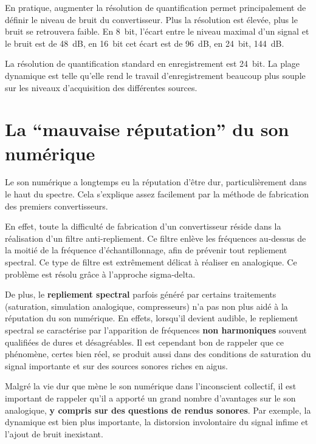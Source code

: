 \documentclass[
]{book}
\begin{document}
En pratique, augmenter la résolution de quantification permet principalement de définir le niveau de bruit du convertisseur. Plus la résolution est élevée, plus le bruit se retrouvera faible. En 8~bit, l'écart entre le niveau maximal d'un signal et le bruit est de 48~dB, en 16~bit cet écart est de 96~dB, en 24~bit, 144~dB.

La résolution de quantification standard en enregistrement est 24~bit. La plage dynamique est telle qu'elle rend le travail d'enregistrement beaucoup plus souple sur les niveaux d'acquisition des différentes sources.

\hypertarget{la-mauvaise-ruxe9putation-du-son-numuxe9rique}{%
\section{La ``mauvaise réputation'' du son numérique}\label{la-mauvaise-ruxe9putation-du-son-numuxe9rique}}

Le son numérique a longtemps eu la réputation d'être dur, particulièrement dans le haut du spectre. Cela s'explique assez facilement par la méthode de fabrication des premiers convertisseurs.

En effet, toute la difficulté de fabrication d'un convertisseur réside dans la réalisation d'un filtre anti-repliement. Ce filtre enlève les fréquences au-dessus de la moitié de la fréquence d'échantillonnage, afin de prévenir tout repliement spectral. Ce type de filtre est extrêmement délicat à réaliser en analogique. Ce problème est résolu grâce à l'approche sigma-delta.

De plus, le \textbf{repliement spectral} parfois généré par certains traitements (saturation, simulation analogique, compresseurs) n'a pas non plus aidé à la réputation du son numérique. En effets, lorsqu'il devient audible, le repliement spectral se caractérise par l'apparition de fréquences \textbf{non harmoniques} souvent qualifiées de dures et désagréables. Il est cependant bon de rappeler que ce phénomène, certes bien réel, se produit aussi dans des conditions de saturation du signal importante et sur des sources sonores riches en aigus.

Malgré la vie dur que mène le son numérique dans l'inconscient collectif, il est important de rappeler qu'il a apporté un grand nombre d'avantages sur le son analogique, \textbf{y compris sur des questions de rendus sonores}. Par exemple, la dynamique est bien plus importante, la distorsion involontaire du signal infime et l'ajout de bruit inexistant.
\end{document}
